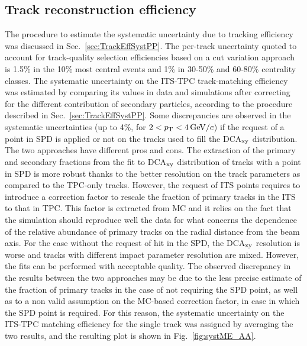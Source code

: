 \subsection{Track reconstruction efficiency}
\label{sec:TrackEffSystPbPb}
The procedure to estimate the systematic uncertainty due to
 tracking efficiency was discussed in Sec.~\ref{sec:TrackEffSystPP}.
The per-track uncertainty quoted to account for track-quality selection efficiencies
based on a cut variation approach is 1.5\% in the 10\% most central events and 1\% in 30-50\% and 60-80\% 
centrality classes. The systematic uncertainty on the ITS-TPC 
track-matching efficiency was estimated by comparing its values in data and simulations
after correcting for the different contribution of secondary particles, according to
the procedure described in Sec.~\ref{sec:TrackEffSystPP}.
Some discrepancies are observed in the systematic uncertainties (up to 4\%, for $2 < p_{\rm T} < 4\, \mathrm{GeV}/c$)
if the request of a point in SPD is applied or not on the tracks used to fill the DCA$_{\rm xy}$ distribution.
The two approaches have different pros and cons. The extraction of the primary
and secondary fractions from the fit to DCA$_{\rm xy}$ distribution of
tracks with a point in SPD is more robust thanks to the better resolution on the track 
parameters as compared to the TPC-only tracks. However, the request of
ITS points requires to introduce a correction factor to rescale the fraction of primary tracks in the ITS
to that in TPC. This factor is extracted from MC and it
relies on the fact that the simulation should reproduce well the data for what concerns
the dependence of the relative abundance of primary tracks on the radial distance from the beam axis.
For the case without the request of hit in the SPD, the DCA$_{\rm xy}$
resolution is worse and tracks with different impact parameter resolution are mixed. 
However, the fits can be performed with acceptable quality.
The observed discrepancy in the results between the two approaches 
may be due to the less precise estimate
of the fraction of primary tracks in the case of not requiring the SPD point, as well as
to a non valid assumption on the MC-based correction factor, in case in which 
the SPD point is required. For this reason, the systematic 
uncertainty on the ITS-TPC matching efficiency for the single track was
assigned by averaging the two results, and the resulting plot is shown in Fig.~\ref{fig:systME_AA}.\\
